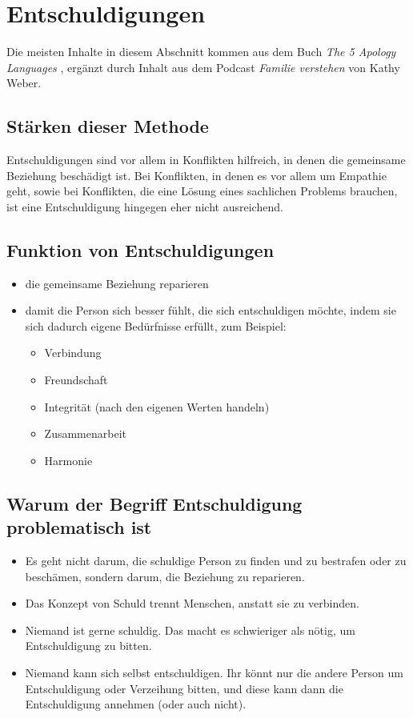 \section{Entschuldigungen}
\label{entschuldigungen}

Die meisten Inhalte in diesem Abschnitt kommen aus dem Buch \emph{The 5 Apology Languages} \cite{apology-languages}, ergänzt durch Inhalt aus dem Podcast \emph{Familie verstehen} \cite{familie-verstehen-podcast} von Kathy Weber.

\subsection{Stärken dieser Methode}

Entschuldigungen sind vor allem in Konflikten hilfreich, in denen die gemeinsame Beziehung beschädigt ist. Bei Konflikten, in denen es vor allem um Empathie geht, sowie bei Konflikten, die eine Lösung eines sachlichen Problems brauchen, ist eine Entschuldigung hingegen eher nicht ausreichend.

\subsection{Funktion von Entschuldigungen}

\begin{itemize}
    \item die gemeinsame Beziehung reparieren
    \item damit die Person sich besser fühlt, die sich entschuldigen möchte, indem sie sich dadurch eigene Bedürfnisse erfüllt, zum Beispiel:
    \begin{itemize}
        \item Verbindung
        \item Freundschaft
        \item Integrität (nach den eigenen Werten handeln)
        \item Zusammenarbeit
        \item Harmonie
    \end{itemize}
\end{itemize}

\subsection{Warum der Begriff \glqq Entschuldigung\grqq{} problematisch ist}

\begin{itemize}
    \item Es geht nicht darum, die schuldige Person zu finden und zu bestrafen oder zu beschämen, sondern darum, die Beziehung zu reparieren.
    \item Das Konzept von Schuld trennt Menschen, anstatt sie zu verbinden.
    \item Niemand ist gerne schuldig. Das macht es schwieriger als nötig, um Entschuldigung zu bitten.
    \item Niemand kann sich selbst entschuldigen. Ihr könnt nur die andere Person um Entschuldigung oder Verzeihung bitten, und diese kann dann die Entschuldigung annehmen (oder auch nicht).
\end{itemize}

